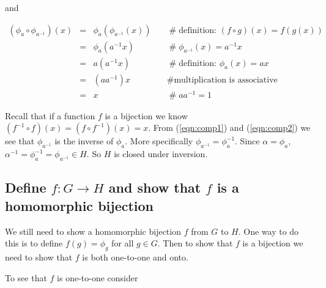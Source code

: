 \documentclass[11pt, oneside]{article}   	%
\theoremstyle{definition}
\begin{document}
\bigskip
\noindent
and  

\bigskip
\begin{equation}
\begin{array}{rcll}
(\phi_{a} \circ \phi_{a^{-1}})(x)
&=& \phi_{a}(\phi_{a^{-1}}(x))      &\quad  \mathrel{\#} \text{definition: $(f \circ g)(x) = f(g(x))$}  \\
&=& \phi_{a}(a^{-1}x)                   &\quad  \mathrel{\#} \phi_{a^{-1}}(x) = a^{-1}x                          \\
&=& a(a^{-1}x)                             &\quad  \mathrel{\#} \text{definition: }  \phi_{a}(x) = ax             \\
&=& (a a^{-1})x                            &\quad  \mathrel{\#} \text{multiplication is associative}             \\
&=& x                                           &\quad  \mathrel{\#} aa^{-1} = 1
\end{array}
\label{eqn:comp2}
\end{equation}

\bigskip
\noindent
Recall that if a function $f$ is a bijection we know $(f^{-1} \circ f)(x) = (f \circ f^{-1})(x) = x$.  From (\ref{eqn:comp1}) 
and  (\ref{eqn:comp2}) we see that  $\phi_{a^{-1}}$ is the inverse of $\phi_a$. More specifically $\phi_{a^{-1}} = \phi^{-1}_{a}$.
Since $\alpha = \phi_a$,  $\alpha^{-1} = \phi^{-1}_a = \phi_{a^{-1}}  \in H$. So $H$ is closed under inversion.



\subsection{Define $f:G \rightarrow H$ and show that $f$ is a homomorphic bijection}
We still need to show a homomorphic bijection $f$ from $G$ to $H$. One way to do this is to define $f(g) = \phi_{g}$ for all $g \in G$. 
Then to show that $f$ is a bijection we need to show that $f$ is both  one-to-one and onto.

\bigskip
\noindent
To see that $f$ is one-to-one consider
\end{document}
